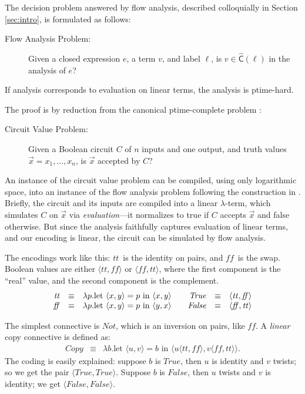 \documentclass{llncs}
\newcommand\True{\ensuremath{\mathit{True}}}
\newcommand\False{\ensuremath{\mathit{False}}}
\newcommand\TT{\ensuremath{\mathit{tt}}}
\newcommand\FF{\ensuremath{\mathit{ff}}}
\newcommand\Not{\ensuremath{\mathit{Not}}}
\newcommand\Copy{\ensuremath{\mathit{Copy}}}
\newcommand\ptime{{\sc ptime}}
\newcommand\cache{\widehat{\mathsf{C}}}
\begin{document}
The decision problem answered by flow analysis, described colloquially
in Section \ref{sec:intro}, is formulated as follows:
\begin{description}
\item[Flow Analysis Problem:] Given a closed expression $e$, a term
$v$, and label $\ell$, is $v \in \cache(\ell)$ in the analysis of $e$?
\end{description}

\begin{theorem}
If analysis corresponds to evaluation on linear terms, the analysis is
\ptime-hard.
\end{theorem}
The proof is by reduction from the canonical \ptime-complete problem
\cite{ladner-75}:
\begin{description}
\item[Circuit Value Problem:] Given a Boolean circuit $C$ of $n$
inputs and one output, and truth values $\vec{x} = x_1,\dots,x_n$, is
$\vec{x}$ accepted by $C$?
\end{description}

An instance of the circuit value problem can be compiled, using only
logarithmic space, into an instance of the flow analysis problem
following the construction in \cite{vanhorn-mairson-07}.  Briefly, the
circuit and its inputs are compiled into a linear $\lambda$-term,
which simulates $C$ on $\vec{x}$ via {\em evaluation}---it normalizes
to true if $C$ accepts $\vec{x}$ and false otherwise.  But since the
analysis faithfully captures evaluation of linear terms, and our
encoding is linear, the circuit can be simulated by flow analysis.

The encodings work like this: \TT\ is the identity on pairs, and \FF\
is the swap.  Boolean values are either $\langle\TT,\FF\rangle$ or
$\langle\FF,\TT\rangle$, where the first component is the ``real''
value, and the second component is the complement.  
\begin{displaymath}
\begin{array}{rcl@{\qquad}rcl}
\TT & \equiv & \lambda p . \mbox{let }\langle x,y \rangle = p\mbox{ in } \langle x, y\rangle &
\True & \equiv &\langle \TT,\FF \rangle\\
\FF & \equiv & \lambda p . \mbox{let }\langle x,y \rangle = p\mbox{ in } \langle y, x\rangle &
\False & \equiv &\langle \FF,\TT \rangle
\end{array}
\end{displaymath}

The simplest connective is \Not, which is an inversion on pairs, like
\FF.  A {\em linear} copy connective is defined as:
\begin{eqnarray*}
\Copy & \equiv & \lambda b.\mbox{let }\langle u,v\rangle = b\mbox{ in }
\langle u\langle \TT,\FF\rangle, v\langle \FF,\TT\rangle\rangle.
\end{eqnarray*}
The coding is easily explained: suppose $b$ is \True, then $u$ is identity and $v$
twists; so we get the pair $\langle\True,\True\rangle$.  Suppose $b$
is \False, then $u$ twists and $v$ is identity; we get
$\langle\False,\False\rangle$.  
\end{document}
